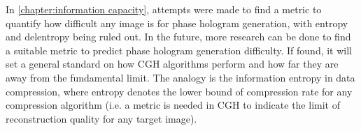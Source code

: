 In \cref{chapter:information capacity}, attempts were made to find a metric to quantify how difficult any image is for phase hologram generation, with entropy and delentropy being ruled out. In the future, more research can be done to find a suitable metric to predict phase hologram generation difficulty. If found, it will set a general standard on how CGH algorithms perform and how far they are away from the fundamental limit. The analogy is the information entropy in data compression, where entropy denotes the lower bound of compression rate for any compression algorithm (i.e. a metric is needed in CGH to indicate the limit of reconstruction quality for any target image).